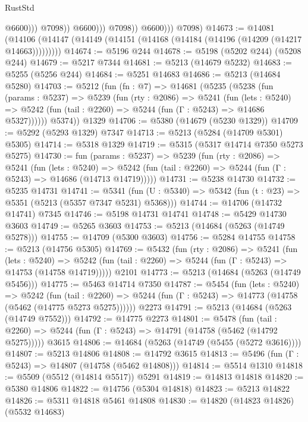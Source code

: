 \begin{lexlean}{RustStd}
\begin{coremodule}
                                @6600)))
                          @7098))
                      @6600)))
                @7098))
            @6600)))
      @7098)
@14673 := @14081
    (@14106 (@14147 (@14149 (@14151 (@14168 (@14184 (@14196 (@14209 (@14217 @14663)))))))))
@14674 := @5196 @244
@14678 := @5198 (@5202 @244) (@5208 @244)
@14679 := @5217 @7344
@14681 := @5213 (@14679 @5232)
@14683 := @5255 (@5256 @244)
@14684 := @5251 @14683
@14686 := @5213 (@14684 @5280)
@14703 := @5212
    (fun (fn : @7) =>
    @14681
      (@5235
        (@5238
          (fun (params : @5237) =>
          @5239
            (fun (rty : @2086) =>
            @5241
              (fun (lets : @5240) =>
              @5242 (fun (tail : @2260) => @5244 (fun (Γ : @5243) => @14686 @5327))))))
        @5374))
    @1329
@14706 := @5380 (@14679 (@5230 @1329))
@14709 := @5292 (@5293 @1329) @7347
@14713 := @5213 (@5284 (@14709 @5301) @5305)
@14714 := @5318 @1329
@14719 := @5315 (@5317 @14714 @7350 @5273 @5275)
@14730 := fun (params : @5237) =>
  @5239
    (fun (rty : @2086) =>
    @5241
      (fun (lets : @5240) =>
      @5242 (fun (tail : @2260) => @5244 (fun (Γ : @5243) => @14686 (@14713 @14719)))))
@14731 := @5238 @14730
@14732 := @5235 @14731
@14741 := @5341
    (fun (U : @5340) => @5342 (fun (t : @23) => @5351 (@5213 (@5357 @7347 @5231) @5368)))
@14744 := @14706 (@14732 @14741) @7345
@14746 := @5198 @14731 @14741
@14748 := @5429 @14730 @3603
@14749 := @5265 @3603
@14753 := @5213 (@14684 (@5263 (@14749 @5278)))
@14755 := @14709 (@5300 @3603)
@14756 := @5284 @14755
@14758 := @5213 (@14756 @5305)
@14769 := @5432
    (fun (rty : @2086) =>
    @5241
      (fun (lets : @5240) =>
      @5242 (fun (tail : @2260) => @5244 (fun (Γ : @5243) => @14753 (@14758 @14719)))))
    @2101
@14773 := @5213 (@14684 (@5263 (@14749 @5456)))
@14775 := @5463 @14714 @7350
@14787 := @5454
    (fun (lets : @5240) =>
    @5242
      (fun (tail : @2260) =>
      @5244 (fun (Γ : @5243) => @14773 (@14758 (@5462 (@14775 @5273 @5275))))))
    @2273
@14791 := @5213 (@14684 (@5263 (@14749 @7552)))
@14792 := @14775 @2273
@14801 := @5478
    (fun (tail : @2260) => @5244 (fun (Γ : @5243) => @14791 (@14758 (@5462 (@14792 @5275)))))
    @3615
@14806 := @14684 (@5263 (@14749 (@5455 (@5272 @3616))))
@14807 := @5213 @14806
@14808 := @14792 @3615
@14813 := @5496 (fun (Γ : @5243) => @14807 (@14758 (@5462 @14808)))
@14814 := @5514 @1310
@14818 := @5509 (@5512 (@14814 @5517)) @5291
@14819 := @14813 @14818
@14820 := @5380 @14806
@14822 := @14756 (@5304 @14818)
@14823 := @5213 @14822
@14826 := @5311 @14818 @5461 @14808
@14830 := @14820 (@14823 @14826) (@5532 @14683)

\end{coremodule}
\end{lexlean}
